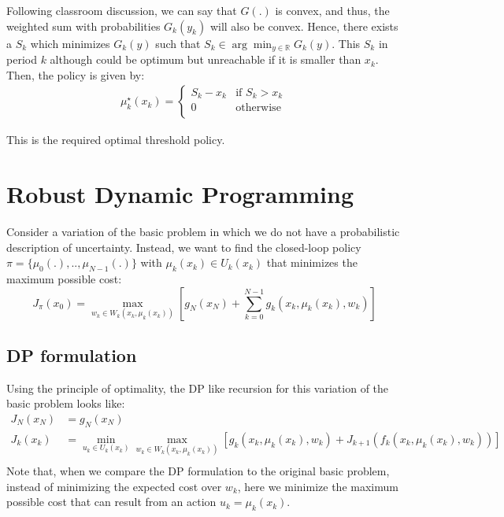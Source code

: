 \documentclass[11pt, oneside]{article}   	%
\begin{document}
Following classroom discussion, we can say that $G(.)$ is convex, and thus, the weighted sum with probabilities $G_k(y_k)$ will also be convex. Hence, there exists a $S_k$ which minimizes $G_k(y)$ such that $S_k \in \arg \min_{y \in \mathbb{R}} G_k(y)$. This $S_k$ in period $k$ although could be optimum but unreachable if it is smaller than $x_k$. Then, the policy is given by:
\begin{align*}
\mu_k^{\star}(x_k)=
\begin{cases}
S_k-x_k & \text{if }S_k>x_k\\
0 & \text{otherwise }\\
\end{cases}
\end{align*}

This is the required optimal threshold policy.

\section{Robust Dynamic Programming}
Consider a variation of the basic problem in which we do not have a probabilistic description of uncertainty. Instead, we want to find the closed-loop policy $\pi = \{\mu_0(.),..,\mu_{N-1}(.)\}$ with $\mu_k(x_k) \in U_k(x_k)$ that minimizes the maximum possible cost:
$$
J_{\pi}(x_0) = \max_{w_k \in W_k(x_k,\mu_k(x_k))} \left[ g_N(x_N) + \sum_{k=0}^{N-1} g_k(x_k,\mu_k(x_k), w_k)\right]
$$

\subsection{DP formulation}
Using the principle of optimality, the DP like recursion for this variation of the basic problem looks like:
\begin{align*}
J_{N}(x_{N}) &= g_N(x_N)\\
J_{k}(x_{k}) &= \min_{u_k \in U_k(x_k)} \max_{w_k \in W_k(x_k,\mu_k(x_k))} \left[ g_k(x_k,\mu_k(x_k),w_k) + J_{k+1}(f_k(x_k,\mu_k(x_k),w_k))\right]\\
\end{align*}
Note that, when we compare the DP formulation to the original basic problem, instead of minimizing the expected cost over $w_k$, here we minimize the maximum possible cost that can result from an action $u_k=\mu_k(x_k)$.
\end{document}
